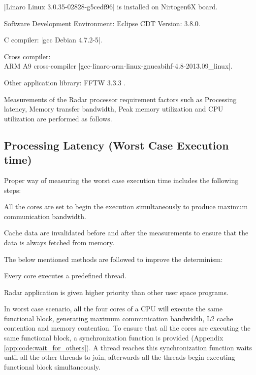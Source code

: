 \begin{compactitem} 
	\item \bverb|Linaro Linux 3.0.35-02828-g5cedf96| is installed on Nirtogen6X board.
	\item Software Development Environment: Eclipse CDT Version: 3.8.0.
	\item C compiler: \bverb|gcc Debian 4.7.2-5|.
	\item Cross compiler: \\ARM A9 cross-compiler \bverb|gcc-linaro-arm-linux-gnueabihf-4.8-2013.09_linux|.
	\item Other application library: FFTW 3.3.3 \cite{fftw}. \\
\end{compactitem} 

Measurements of the Radar processor requirement factors such as Processing latency, Memory transfer bandwidth, Peak memory utilization and CPU utilization are performed as follows.

\subsection{Processing Latency (Worst Case Execution time)}
\label{ss:mm:latency}
Proper way of measuring the worst case execution time includes the following steps:
\begin{compactitem} 
	\item All the cores are set to begin the execution simultaneously to produce maximum communication bandwidth.
	\item Cache data are invalidated before and after the measurements to ensure that the data is always fetched from memory.
\end{compactitem} 

\noindent
The below mentioned methods are followed to improve the determinism:
\begin{compactitem} 
	\item Every core executes a predefined thread.
	\item Radar application is given higher priority than other user space programs. \\
\end{compactitem} 

In worst case scenario, all the four cores of a CPU will execute the same functional block, generating maximum communication bandwidth, L2 cache contention and memory contention. To ensure that all the cores are executing the same functional block, a synchronization function is provided (Appendix \ref{app:code:wait_for_others}). A thread reaches this synchronization function waits until all the other threads to join, afterwards all the threads begin executing functional block simultaneously.

